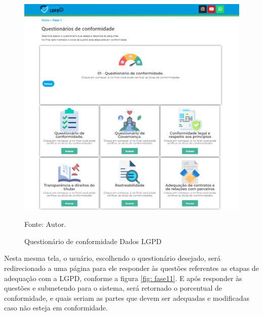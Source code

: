 \documentclass[
	12pt,				%
	openright,			%
	oneside,			%
	a4paper,			%
	english,			%
	french,				%
	spanish,			%
	brazil,				%
	]{abntex2}
\begin{document}
\begin{figure}[ht]
    \centering
    \caption{Questionário de conformidade Dados LGPD}
    \includegraphics[width=6.6in]{Images/fase1.png}
    \label{fig: homepage}
    
    \centering \small Fonte: Autor.
\end{figure}

Nesta mesma tela, o usuário, escolhendo o questionário desejado, será redirecionado a uma página para ele responder às questões referentes as etapas de adequação com a LGPD, conforme a figura \ref{fig: fase11}. E após responder às questões e submetendo para o sistema, será retornado o porcentual de conformidade, e quais seriam as partes que devem ser adequadas e modificadas caso não esteja em conformidade.
\end{document}

